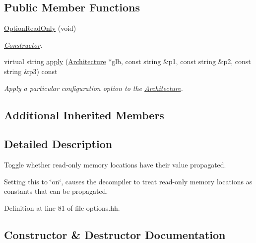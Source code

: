 \subsection*{Public Member Functions}
\begin{DoxyCompactItemize}
\item 
\mbox{\hyperlink{class_option_read_only_ac807fa7f893f5f2c6ab8da8825780803}{Option\+Read\+Only}} (void)
\begin{DoxyCompactList}\small\item\em \mbox{\hyperlink{class_constructor}{Constructor}}. \end{DoxyCompactList}\item 
virtual string \mbox{\hyperlink{class_option_read_only_a3ef9635661526f6d08d665fa4b6f69a8}{apply}} (\mbox{\hyperlink{class_architecture}{Architecture}} $\ast$glb, const string \&p1, const string \&p2, const string \&p3) const
\begin{DoxyCompactList}\small\item\em Apply a particular configuration option to the \mbox{\hyperlink{class_architecture}{Architecture}}. \end{DoxyCompactList}\end{DoxyCompactItemize}
\subsection*{Additional Inherited Members}


\subsection{Detailed Description}
Toggle whether read-\/only memory locations have their value propagated. 

Setting this to \char`\"{}on\char`\"{}, causes the decompiler to treat read-\/only memory locations as constants that can be propagated. 

Definition at line 81 of file options.\+hh.



\subsection{Constructor \& Destructor Documentation}
\mbox{\label{class_option_read_only_ac807fa7f893f5f2c6ab8da8825780803}} 
